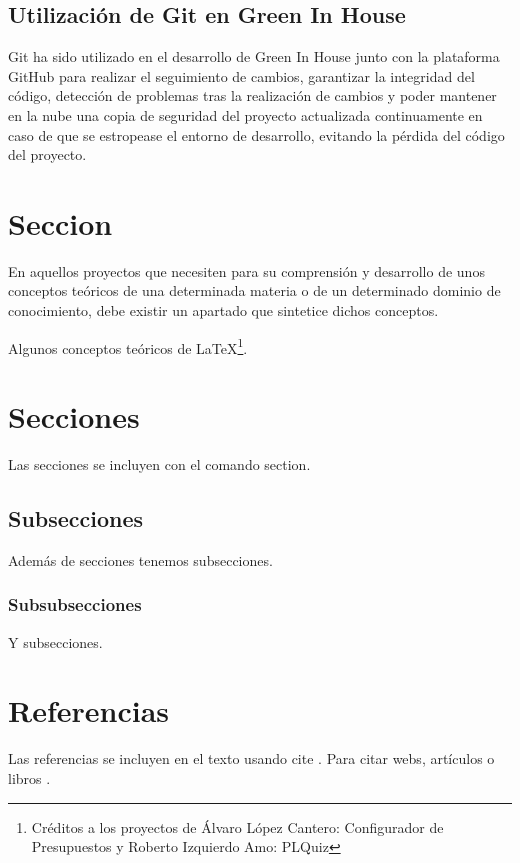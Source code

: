     \subsection{Utilización de Git en Green In House}
    Git ha sido utilizado en el desarrollo de Green In House junto con la plataforma GitHub para realizar el seguimiento de cambios, garantizar la integridad del código, detección de problemas tras la realización de cambios y poder mantener en la nube una copia de seguridad del proyecto actualizada continuamente en caso de que se estropease el entorno de desarrollo, evitando la pérdida del código del proyecto.




\section{Seccion}

En aquellos proyectos que necesiten para su comprensión y desarrollo de unos conceptos teóricos de una determinada materia o de un determinado dominio de conocimiento, debe existir un apartado que sintetice dichos conceptos.

Algunos conceptos teóricos de \LaTeX \footnote{Créditos a los proyectos de Álvaro López Cantero: Configurador de Presupuestos y Roberto Izquierdo Amo: PLQuiz}.

\section{Secciones}

Las secciones se incluyen con el comando section.

\subsection{Subsecciones}

Además de secciones tenemos subsecciones.

\subsubsection{Subsubsecciones}

Y subsecciones. 


\section{Referencias}

Las referencias se incluyen en el texto usando cite \cite{wiki:latex}. Para citar webs, artículos o libros \cite{koza92}.


